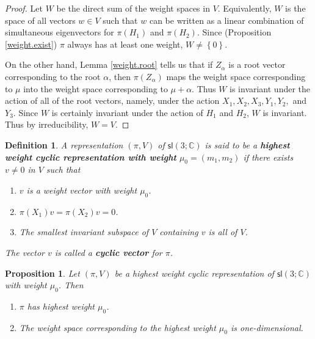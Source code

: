 \documentclass[12pt]{amsbook}
\theoremstyle{plain}
\newtheorem{definition}[theorem]{Definition}
\newtheorem{proposition}[theorem]{Proposition}
\numberwithin{equation}{chapter}
\numberwithin{theorem}{chapter}
\begin{document}
\begin{proof}
Let $W$ be the direct sum of the weight spaces in $V$. Equivalently, $W$ is
the space of all vectors $w\in V$ such that $w$ can be written as a linear
combination of simultaneous eigenvectors for $\pi(H_{1})$ and $\pi(H_{2})$.
Since (Proposition \ref{weight.exist}) $\pi$ always has at least one weight,
$W\neq\left\{  0\right\}  $.

On the other hand, Lemma \ref{weight.root} tells us that if $Z_{\alpha}$ is a
root vector corresponding to the root $\alpha$, then $\pi(Z_{\alpha})$ maps
the weight space corresponding to $\mu$ into the weight space corresponding to
$\mu+\alpha$. Thus $W$ is invariant under the action of all of the root
vectors, namely, under the action $X_{1},X_{2},X_{3},Y_{1},Y_{2},$ and $Y_{3}%
$. Since $W$ is certainly invariant under the action of $H_{1}$ and $H_{2}$,
$W$ is invariant. Thus by irreducibility, $W=V$.
\end{proof}

\begin{definition}
A representation $\left(  \pi,V\right)  $ of $\mathsf{sl}\left(
3;\mathbb{C}\right)  $ is said to be a \textbf{highest weight cyclic
representation with weight }$\mu_{0}=(m_{1},m_{2})$ if there exists $v\neq0$
in $V$ such that

\begin{enumerate}
\item $v$ is a weight vector with weight $\mu_{0}$.

\item $\pi(X_{1})v=\pi(X_{2})v=0$.

\item  The smallest invariant subspace of $V$ containing $v$ is all of $V$.
\end{enumerate}

\noindent The vector $v$ is called a \textbf{cyclic vector} for $\pi$.
\end{definition}

\begin{proposition}
\label{highest.highest}Let $\left(  \pi,V\right)  $ be a highest weight cyclic
representation of $\mathsf{sl}\left(  3;\mathbb{C}\right)  $ with weight
$\mu_{0}$. Then

\begin{enumerate}
\item $\pi$ has highest weight $\mu_{0}$.

\item  The weight space corresponding to the highest weight $\mu_{0}$ is one-dimensional.
\end{enumerate}
\end{proposition}
\end{document}
